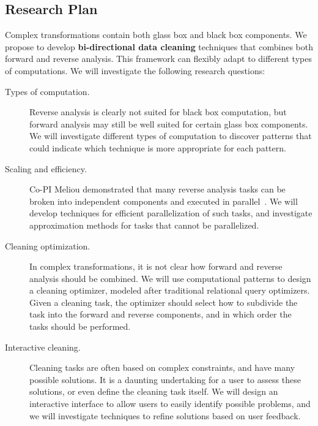 \subsection{Research Plan} %
\label{sub:research_plan}
Complex transformations contain both glass box and black box components. We propose to develop \textbf{bi-directional data cleaning} techniques that combines both forward and reverse analysis. This framework can flexibly adapt to different types of computations. We will investigate the following research questions:
\begin{description}
	\item[Types of computation.] Reverse analysis is clearly not suited for black box computation, but forward analysis may still be well suited for certain glass box components. We will investigate different types of computation to discover patterns that could indicate which technique is more appropriate for each pattern.
	\item[Scaling and efficiency.] Co-PI Meliou demonstrated that many reverse analysis tasks can be broken into independent components and executed in parallel~\cite{DBLP:conf/sigmod/MeliouS12}. We will develop techniques for efficient parallelization of such tasks, and investigate approximation methods for tasks that cannot be parallelized.
	\item[Cleaning optimization.] In complex transformations, it is not clear how forward and reverse analysis should be combined. We will use computational patterns to design a cleaning optimizer, modeled after traditional relational query optimizers. Given a cleaning task, the optimizer should select how to subdivide the task into the forward and reverse components, and in which order the tasks should be performed.
	\item[Interactive cleaning.] Cleaning tasks are often based on complex constraints, and have many possible solutions. It is a daunting undertaking for a user to assess these solutions, or even define the cleaning task itself.  We will design an interactive interface to allow users to easily identify possible problems, and we will investigate techniques to refine solutions based on user feedback.
\end{description}





